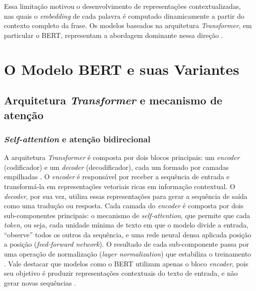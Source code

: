 \documentclass[
    12pt,                %
    openright,           %
    oneside,             %
    a4paper,             %
    english,             %
    brazil               %
]{abntex2}
\begin{document}
Essa limitação motivou o desenvolvimento de representações contextualizadas, nas quais o \textit{embedding} de cada palavra é computado dinamicamente a partir do contexto completo da frase. Os modelos baseados na arquitetura \textit{Transformer}, em particular o BERT, representam a abordagem dominante nessa direção \cite{devlin2019}.

\section{O Modelo BERT e suas Variantes}
\label{sec:bert}

\subsection{Arquitetura \textit{Transformer} e mecanismo de atenção}
\label{subsec:bert_transformer}

\subsubsection{\textit{Self-attention} e atenção bidirecional}
\label{subsubsec:bert_attention}

A arquitetura \textit{Transformer} é composta por dois blocos principais: 
um \textit{encoder} (codificador) e um \textit{decoder} (decodificador), 
cada um formado por camadas empilhadas \cite{vaswani2017}. O \textit{encoder} 
é responsável por receber a sequência de entrada e transformá-la em 
representações vetoriais ricas em informação contextual. O \textit{decoder}, 
por sua vez, utiliza essas representações para gerar a sequência de saída como uma tradução ou resposta. Cada camada do \textit{encoder} é composta 
por dois sub-componentes principais: o mecanismo de \textit{self-attention}, 
que permite que cada \textit{token}, ou seja, cada unidade mínima de texto em que 
o modelo divide a entrada, ``observe'' todos os outros da sequência, 
e uma rede neural densa aplicada posição a posição (\textit{feed-forward 
network}). O resultado de cada sub-componente passa por uma operação de 
normalização (\textit{layer normalization}) que estabiliza o treinamento 
\cite{vaswani2017}. Vale destacar que modelos como o BERT utilizam apenas 
o bloco \textit{encoder}, pois seu objetivo é produzir representações 
contextuais do texto de entrada, e não gerar novas sequências \cite{devlin2019}.
\end{document}
